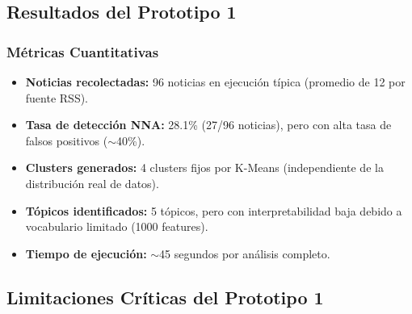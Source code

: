 \subsection{Resultados del Prototipo 1}

\subsubsection{Métricas Cuantitativas}
\begin{itemize}
    \item \textbf{Noticias recolectadas:} 96 noticias en ejecución típica (promedio de 12 por fuente RSS).
    \item \textbf{Tasa de detección NNA:} 28.1\% (27/96 noticias), pero con alta tasa de falsos positivos ($\sim$40\%).
    \item \textbf{Clusters generados:} 4 clusters fijos por K-Means (independiente de la distribución real de datos).
    \item \textbf{Tópicos identificados:} 5 tópicos, pero con interpretabilidad baja debido a vocabulario limitado (1000 features).
    \item \textbf{Tiempo de ejecución:} $\sim$45 segundos por análisis completo.
\end{itemize}

\subsection{Limitaciones Críticas del Prototipo 1}

